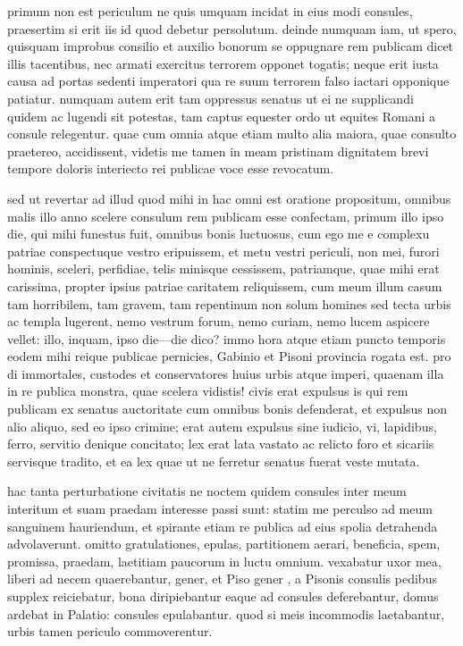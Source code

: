  primum non est periculum ne quis umquam incidat in eius modi consules, praesertim si erit iis id quod debetur persolutum. deinde numquam iam, ut spero, quisquam improbus consilio et auxilio bonorum se oppugnare rem publicam dicet illis tacentibus, nec armati exercitus terrorem opponet togatis; neque erit iusta causa ad portas sedenti imperatori qua re suum terrorem falso iactari opponique patiatur. numquam autem erit tam oppressus senatus ut ei ne supplicandi quidem ac lugendi sit potestas, tam captus equester ordo ut equites Romani a consule relegentur. quae cum omnia atque etiam multo alia maiora, quae consulto praetereo, accidissent, videtis me tamen in meam pristinam dignitatem brevi tempore doloris interiecto rei publicae voce esse revocatum.

 sed ut revertar ad illud quod mihi in hac omni est oratione propositum, omnibus malis illo anno scelere consulum rem publicam esse confectam, primum illo ipso die, qui mihi funestus fuit, omnibus bonis luctuosus, cum ego me e complexu patriae conspectuque vestro eripuissem, et metu vestri periculi, non mei, furori hominis, sceleri, perfidiae, telis minisque cessissem, patriamque, quae mihi erat carissima, propter ipsius patriae caritatem reliquissem, cum meum illum casum tam horribilem, tam gravem, tam repentinum non solum homines sed tecta urbis ac templa lugerent, nemo vestrum forum, nemo curiam, nemo lucem aspicere vellet: illo, inquam, ipso die—die dico? immo hora atque etiam puncto temporis eodem mihi reique publicae pernicies, Gabinio et Pisoni provincia rogata est. pro di immortales, custodes et conservatores huius urbis atque imperi, quaenam illa in re publica monstra, quae scelera vidistis! civis erat expulsus is qui rem publicam ex senatus auctoritate cum omnibus bonis defenderat, et expulsus non alio aliquo, sed eo ipso crimine; erat autem expulsus sine iudicio, vi, lapidibus, ferro, servitio denique concitato; lex erat lata vastato ac relicto foro et sicariis servisque tradito, et ea lex quae ut ne ferretur senatus fuerat veste mutata.

 hac tanta perturbatione civitatis ne noctem quidem consules inter meum interitum et suam praedam interesse passi sunt: statim me perculso ad meum sanguinem hauriendum, et spirante etiam re publica ad eius spolia detrahenda advolaverunt. omitto gratulationes, epulas, partitionem aerari, beneficia, spem, promissa, praedam, laetitiam paucorum in luctu omnium. vexabatur uxor mea, liberi ad necem quaerebantur, gener, et Piso gener , a Pisonis consulis pedibus supplex reiciebatur, bona diripiebantur eaque ad consules deferebantur, domus ardebat in Palatio: consules epulabantur. quod si meis incommodis laetabantur, urbis tamen periculo commoverentur.

